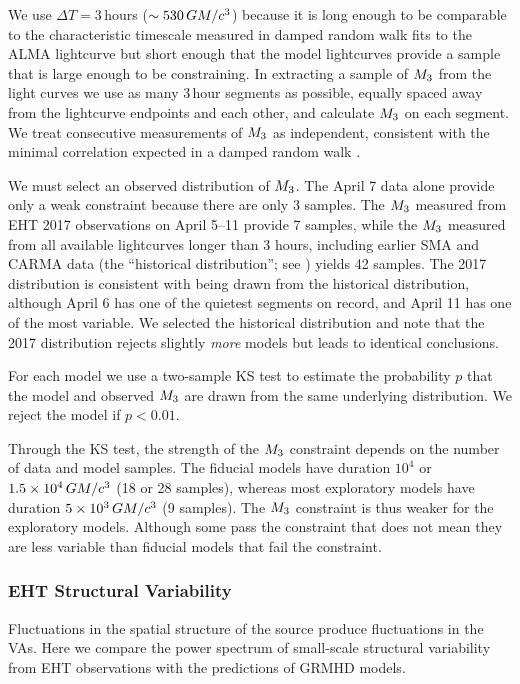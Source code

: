 We use $\Delta T = 3$\,hours ($\sim 530\,GM/c^3$) because it is long enough to be comparable to the characteristic timescale measured in damped random walk fits to the ALMA lightcurve \citep[see Table 10 of][]{Wielgus2022} but short enough that the model lightcurves provide a sample that is large enough to be constraining.
In extracting a sample of $M_{3}$ from the light curves we use as many 3\,hour segments as possible, equally spaced away from the lightcurve endpoints and each other, and calculate $M_{3}$ on each segment.
We treat consecutive measurements of $M_{3}$ as independent, consistent with the minimal correlation expected in a damped random walk \citep{Lee_2022}.

We must select an observed distribution of $M_{3}$.
The April 7 data alone provide only a weak constraint because there are only 3 samples.
The $M_{3}$ measured from EHT 2017 observations on April 5--11 provide 7 samples, while the $M_{3}$ measured from all available lightcurves longer than 3 hours, including earlier SMA and CARMA data (the ``historical distribution''; see \citealt{Wielgus2022}) yields 42 samples.
The 2017 distribution is consistent with being drawn from the historical distribution, although April 6 has one of the quietest segments on record, and April 11 has one of the most variable.
We selected the historical distribution and note that the 2017 distribution rejects slightly {\em more} models but leads to identical conclusions.

For each model we use a two-sample KS test to estimate the probability $p$ that the model and observed $M_{3}$ are drawn from the same underlying distribution.
We reject the model if $p < 0.01$.

Through the KS test, the strength of the $M_{3}$ constraint depends on the number of data and model samples.
The fiducial models have duration $10^4$ or $1.5\times 10^4\,GM/c^3$ (18 or 28 samples), whereas most exploratory models have duration $5 \times 10^3\,GM/c^3$ (9 samples).
The $M_{3}$ constraint is thus weaker for the exploratory models.
Although some pass the constraint that does not mean they are less variable than fiducial models that fail the constraint.

\subsubsection{EHT Structural Variability}

Fluctuations in the spatial structure of the source produce fluctuations in the VAs.
Here we compare  the power spectrum of small-scale structural variability from EHT observations with the predictions of GRMHD models.

